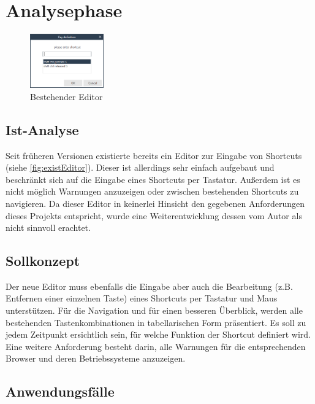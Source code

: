 \section{Analysephase}

\begin{figure}
	\vspace{-12px}
	\centering
	\includegraphics[width=120px]{../img/Alter-Editor.PNG}
	\caption{Bestehender Editor}
	\label{fig:existEditor}
\end{figure}

\subsection{Ist-Analyse}

Seit früheren Versionen existierte bereits ein Editor zur Eingabe von Shortcuts (siehe \autoref{fig:existEditor}). Dieser ist allerdings sehr einfach aufgebaut und beschränkt sich auf die Eingabe eines Shortcuts per Tastatur. Außerdem ist es nicht möglich Warnungen anzuzeigen oder zwischen bestehenden Shortcuts zu navigieren. Da dieser Editor in keinerlei Hinsicht den gegebenen Anforderungen dieses Projekts entspricht, wurde eine Weiterentwicklung dessen vom Autor als nicht sinnvoll erachtet.

\subsection{Sollkonzept}

Der neue Editor muss ebenfalls die Eingabe aber auch die Bearbeitung (z.B. Entfernen einer einzelnen Taste) eines Shortcuts per Tastatur und Maus unterstützen. Für die Navigation und für einen besseren Überblick, werden alle bestehenden Tastenkombinationen in tabellarischen Form präsentiert. Es soll zu jedem Zeitpunkt ersichtlich sein, für welche Funktion der Shortcut definiert wird. Eine weitere Anforderung besteht darin, alle Warnungen für die entsprechenden Browser und deren Betriebssysteme anzuzeigen.

\subsection{Anwendungsfälle}

